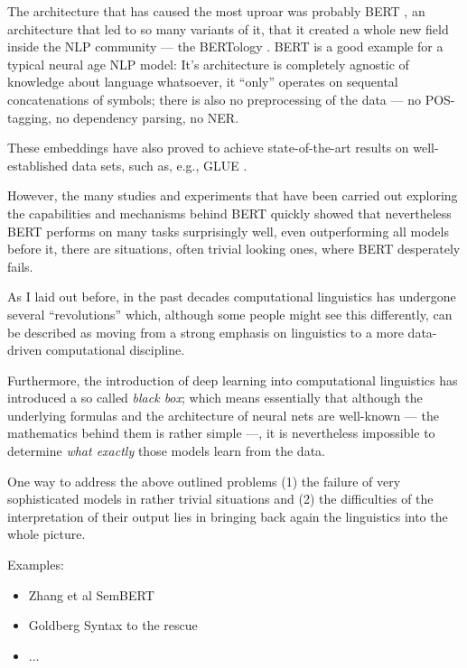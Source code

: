 The architecture that has caused the most uproar was probably BERT \cite{devlin2018bert}, an
architecture that led to so many variants of it, that it created a whole new field inside the
NLP community --- the BERTology \cite{rogers2020primer}. BERT is a good example for a typical
neural age NLP model: It's architecture is completely agnostic of knowledge about language
whatsoever, it ``only'' operates on sequental concatenations of symbols; there is also no
preprocessing of the data --- no POS-tagging, no dependency parsing, no NER.

These embeddings have also
proved to achieve state-of-the-art results on well-established data sets, such as, e.g.,
GLUE \cite{wang2018glue}.

{\color{red} However, the many studies and experiments that have been carried out exploring the capabilities
and mechanisms behind BERT quickly showed that nevertheless BERT performs on many tasks
surprisingly well, even outperforming all models before it, there are situations, often trivial
looking ones, where BERT desperately fails.}

As I laid out before, in the past decades computational linguistics has undergone several
``revolutions'' which, although some people might see this differently, can be described as
moving from a strong emphasis on linguistics to a more data-driven computational discipline.

Furthermore, the introduction of deep learning into computational linguistics has introduced a
so called \emph{black box}; which means essentially that although the underlying formulas and the
architecture of neural nets are well-known --- the mathematics behind them is rather simple ---,
it is nevertheless impossible to determine \emph{what exactly} those models learn from the data.

One way to address the above outlined problems (1) the failure of very sophisticated models
in rather trivial situations and (2) the difficulties of the interpretation of their output
lies in bringing back again the linguistics into the whole picture.

Examples:

\begin{itemize}
  \item Zhang et al SemBERT
  \item Goldberg Syntax to the rescue
  \item ...
\end{itemize}


